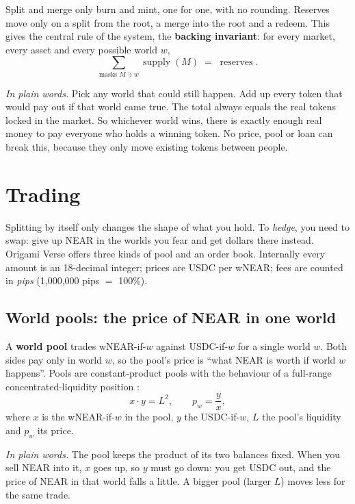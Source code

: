 \documentclass[11pt,a4paper]{article}
\newcommand{\inwords}[1]{\par\noindent\colorbox{note}{\parbox{\dimexpr\linewidth-2\fboxsep}{\small\textit{In plain words.} #1}}\par}
\begin{document}
Split and merge only burn and mint, one for one, with no rounding. Reserves move only on a split from the root, a
merge into the root and a redeem. This gives the central rule of the system, the \textbf{backing invariant}: for
every market, every asset and every possible world $w$,
\begin{equation}
  \sum_{\text{masks } M \ni w} \operatorname{supply}(M) \;=\; \operatorname{reserves}.
  \label{eq:backing}
\end{equation}
\inwords{Pick any world that could still happen. Add up every token that would pay out if that world came true.
The total always equals the real tokens locked in the market. So whichever world wins, there is exactly enough real
money to pay everyone who holds a winning token. No price, pool or loan can break this, because they only move
existing tokens between people.}

\section{Trading}
\label{sec:trading}

Splitting by itself only changes the shape of what you hold. To \emph{hedge}, you need to swap: give up NEAR in the
worlds you fear and get dollars there instead. Origami Verse offers three kinds of pool and an order book. Internally every
amount is an 18-decimal integer; prices are USDC per wNEAR; fees are counted in \emph{pips}
(1,000,000 pips $=$ 100\%).

\subsection{World pools: the price of NEAR in one world}

A \textbf{world pool} trades wNEAR-if-$w$ against USDC-if-$w$ for a single world $w$. Both sides pay only in world
$w$, so the pool's price is ``what NEAR is worth if world $w$ happens''. Pools are constant-product pools with the
behaviour of a full-range concentrated-liquidity position \cite{uniswapv3}:
\begin{equation}
  x \cdot y = L^2, \qquad p_w = \frac{y}{x},
  \label{eq:cpmm}
\end{equation}
where $x$ is the wNEAR-if-$w$ in the pool, $y$ the USDC-if-$w$, $L$ the pool's liquidity and $p_w$ its price.
\inwords{The pool keeps the product of its two balances fixed. When you sell NEAR into it, $x$ goes up, so $y$ must go
down: you get USDC out, and the price of NEAR in that world falls a little. A bigger pool (larger $L$) moves less for
the same trade.}
\end{document}

